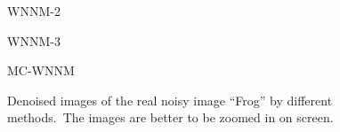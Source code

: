 \begin{figure}
{\begin{minipage}[t]{0.19\textwidth}
{\footnotesize WNNM-2 }
\end{minipage}
\begin{minipage}[t]{0.19\textwidth}
\centering
{}
{\footnotesize WNNM-3 }
\end{minipage}
\begin{minipage}[t]{0.19\textwidth}
\centering
{}
{\footnotesize MC-WNNM }
\end{minipage}
}
    \caption{Denoised images of the real noisy image ``Frog'' \cite{ncwebsite} by different methods.\ The images are better to be zoomed in on screen.}
    \label{fig4-9}
\end{figure}


